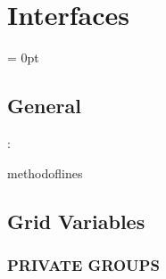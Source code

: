 
\section{Interfaces} 


\parskip = 0pt

\vspace{3mm} \subsection*{General}

: 

methodoflines
\vspace{2mm}
\subsection*{Grid Variables}
\vspace{5mm}\subsubsection{PRIVATE GROUPS}

\vspace{5mm}

